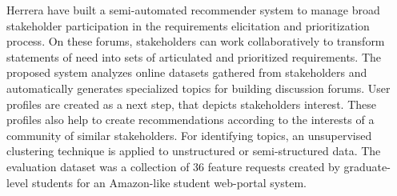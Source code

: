 Herrera \etal \cite{Castro-Herrera:2009} have built a semi-automated recommender system to manage broad stakeholder participation in
the requirements elicitation and prioritization process. On these forums,
stakeholders can work collaboratively to transform statements of need into sets
of articulated and prioritized requirements. The proposed system analyzes online
datasets gathered from stakeholders and automatically
generates specialized topics for building discussion forums. User profiles are
created as a next step, that depicts stakeholders interest. These profiles also help to create recommendations according to the
interests of a community of similar stakeholders. For identifying topics, an unsupervised clustering technique is
applied to unstructured or semi-structured data.
The evaluation  dataset was a collection of 36 feature requests created by
graduate-level students for an Amazon-like student web-portal system.\\





